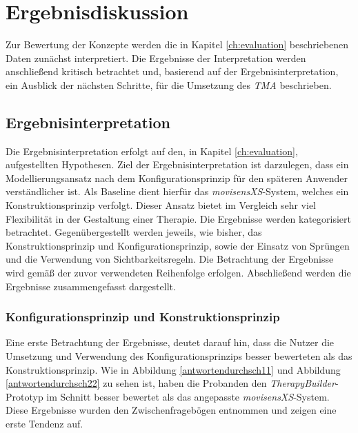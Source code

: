 \chapter{Ergebnisdiskussion}
\label{ch:Results}
Zur Bewertung der Konzepte werden die in Kapitel \ref{ch:evaluation} beschriebenen Daten zunächst interpretiert. Die Ergebnisse der Interpretation werden anschließend kritisch betrachtet und, basierend auf der Ergebnisinterpretation, ein Ausblick der nächsten Schritte, für die Umsetzung des \emph{TMA} beschrieben. 


\section{Ergebnisinterpretation}
Die Ergebnisinterpretation erfolgt auf den, in Kapitel \ref{ch:evaluation}, aufgestellten Hypothesen. Ziel der Ergebnisinterpretation ist darzulegen, dass ein Modellierungsansatz nach dem Konfigurationsprinzip für den späteren Anwender verständlicher ist. Als Baseline dient hierfür das \emph{movisensXS}-System, welches ein Konstruktionsprinzip verfolgt. Dieser Ansatz bietet im Vergleich sehr viel Flexibilität in der Gestaltung einer Therapie. Die Ergebnisse werden kategorisiert betrachtet. Gegenübergestellt werden jeweils, wie bisher, das Konstruktionsprinzip und Konfigurationsprinzip, sowie der Einsatz von Sprüngen und die Verwendung von Sichtbarkeitsregeln. Die Betrachtung der Ergebnisse wird gemäß der zuvor verwendeten Reihenfolge erfolgen. Abschließend werden die Ergebnisse zusammengefasst dargestellt.


\subsection{Konfigurationsprinzip und Konstruktionsprinzip}
Eine erste Betrachtung der Ergebnisse, deutet darauf hin, dass die Nutzer die Umsetzung und Verwendung des Konfigurationsprinzips besser bewerteten als das Konstruktionsprinzip. Wie in Abbildung \ref{antwortendurchsch11} und Abbildung \ref{antwortendurchsch22} zu sehen ist, haben die Probanden den \emph{TherapyBuilder}-Prototyp im Schnitt besser bewertet als das angepasste \emph{movisensXS}-System. Diese Ergebnisse wurden den Zwischenfragebögen entnommen und zeigen eine erste Tendenz auf. 

